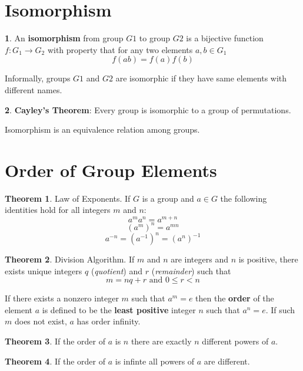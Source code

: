 \documentclass[a4paper,12pt]{article}
\theoremstyle{definition}
\newtheorem{definition}{}[section]
\theoremstyle{axiom}
\theoremstyle{theorem}
\newtheorem{theorem}{Theorem}[section]
\theoremstyle{lemma}
\begin{document}
\section{Isomorphism}
\begin{definition}{}
    An \textbf{isomorphism} from group $G1$ to group $G2$ is a bijective function $f: G_1 \to G_2$ with property that for any two elements $a, b \in G_1$
        \begin{equation}
                f(ab) = f(a)f(b)
        \end{equation}
\end{definition}
Informally, groups $G1$ and $G2$ are isomorphic if they have same elements with different names.
\begin{definition}{}
    \textbf{Cayley's Theorem}: Every group is isomorphic to a group of permutations.
\end{definition}
Isomorphism is an equivalence relation among groups.
\section{Order of Group Elements}
\begin{theorem}{Law of Exponents.}
    If $G$ is a group and $a \in G$ the following identities hold for all integers $m$ and $n$:
        \begin{equation*}\tag{i}
            a^ma^n = a^{m+n}
        \end{equation*}
        \begin{equation*}\tag{ii}
            (a^m)^n = a^{mn}
        \end{equation*}
        \begin{equation*}\tag{iii}
            a^{-n} = (a^{-1})^n = (a^n)^{-1}
        \end{equation*}
\end{theorem}
\begin{theorem}{Division Algorithm.}
        If $m$ and $n$ are integers and $n$ is positive, there exists unique integers $q$ (\textit{quotient}) and $r$ (\textit{remainder}) such that 
    \begin{equation*}
            m = nq + r \text{ and } 0 \leq r < n
    \end{equation*}
\end{theorem}
If there exists a nonzero integer $m$ such that $a^m=e$ then the \textbf{order} of the element $a$ is defined to be the \textbf{least positive} integer $n$ such that $a^n=e$. If such $m$ does not exist, $a$ has order infinity.
\begin{theorem}{}
        If the order of $a$ is $n$ there are exactly $n$ different powers of $a$.
\end{theorem}
\begin{theorem}{}
        If the order of $a$ is infinte all powers of $a$ are different.
\end{theorem}
\end{document}
